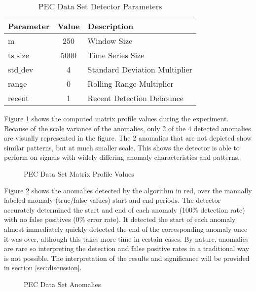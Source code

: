 \begin{table}[H]
\caption{PEC Data Set Detector Parameters}
\begin{tabular}{|l|c|l|}
    \hline
	\textbf{Parameter} & \textbf{Value} & \textbf{Description} \\ \hline
	m & 250 & Window Size \\ \hline
	ts$\_$size & 5000 & Time Series Size \\ \hline
	std$\_$dev & 4 & Standard Deviation Multiplier \\ \hline
	range & 0 & Rolling Range Multiplier\\ \hline
	recent & 1 & Recent Detection Debounce\\ \hline
\end{tabular}
\label{tab:pec_sim_params}
\end{table}

Figure \ref{fig:pec_mp_hist} shows the computed matrix profile values during the experiment. Because of the scale variance of the anomalies, only 2 of the 4 detected anomalies are visually represented in the figure. The 2 anomalies that are not depicted show similar patterns, but at much smaller scale. This shows the detector is able to perform on signals with widely differing anomaly characteristics and patterns.

\begin{figure}[H]
    
    \caption{PEC Data Set Matrix Profile Values}
    \label{fig:pec_mp_hist}
\end{figure}

Figure \ref{fig:pec_outliers} shows the anomalies detected by the algorithm in red, over the manually labeled anomaly (true/false values) start and end periods. The detector accurately determined the start and end of each anomaly (100\% detection rate) with no false positives (0\% error rate). It detected the start of each anomaly almost immediately quickly detected the end of the corresponding anomaly once it was over, although this takes more time in certain cases. By nature, anomalies are rare so interpreting the detection and false positive rates in a traditional way is not possible. The interpretation of the results and significance will be provided in section \ref{sec:discussion}.
 
\begin{figure}[H]
    
    \caption{PEC Data Set Anomalies}
    \label{fig:pec_outliers}
\end{figure}

